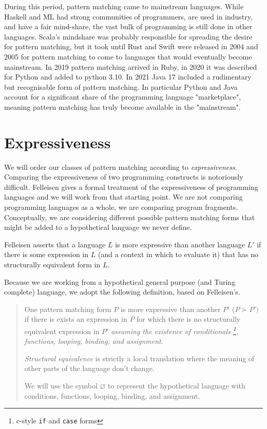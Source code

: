 \documentclass[acmsmall]{acmart}
\begin{document}
During this period, pattern matching came to mainstream languages.  While Haskell and ML had strong communities of programmers, are used in industry, and have a fair mind-share, the vast bulk of programming is still done in other languages.  Scala's mindshare was probably responsible for spreading the desire for pattern matching, but it took until Rust and Swift were released in 2004 and 2005 for pattern matching to come to languages that would eventually become mainstream.  In 2019 pattern matching arrived in Ruby, in 2020 it was described for Python and added to python 3.10.  In 2021 Java 17 included a rudimentary but recognisable form of pattern matching.  In particular Python and Java account for a significant share of the programming language "marketplace", meaning pattern matching has truly become available in the "mainstream".

\section{Expressiveness}
\label{sec:express}
We will order our classes of pattern matching according to \emph{expressiveness}.  Comparing the expressiveness of two programming constructs is notoriously difficult.  Felleisen \cite{Felleisen91} gives a formal treatment of the expressiveness of programming languages and we will work from that starting point.  We are not comparing programming languages as a whole, we are comparing program fragments.  Conceptually, we are considering different possible pattern matching forms that might be added to a hypothetical language we never define.

Felleisen asserts that a language $L$ is more expressive than another language $L'$ if there is some expression in $L$ (and a context in which to evaluate it) that has no structurally equivalent form in $L$.

Because we are working from a hypothetical general purpose (and Turing complete) language, we adopt the following definition, based on Felleisen's.

\begin{quote}
    One pattern matching form $P$ is more expressive than another $P'$ ($P \succ P')$ if there is exists an expression in $P$ for which there is no structurally equivalent expression in $P'$ \emph{assuming the existence of conditionals \footnote{c-style \lstinline{if} and \lstinline{case} forms}, functions, looping, binding, and assignment}.
    
    \emph{Structural equivalence} is strictly a local translation where the meaning of other parts of the language don't change.
    
    We will use the symbol $\varnothing$ to represent the hypothetical language with conditions, functions, looping, binding, and assignment.
\end{quote}
\end{document}
